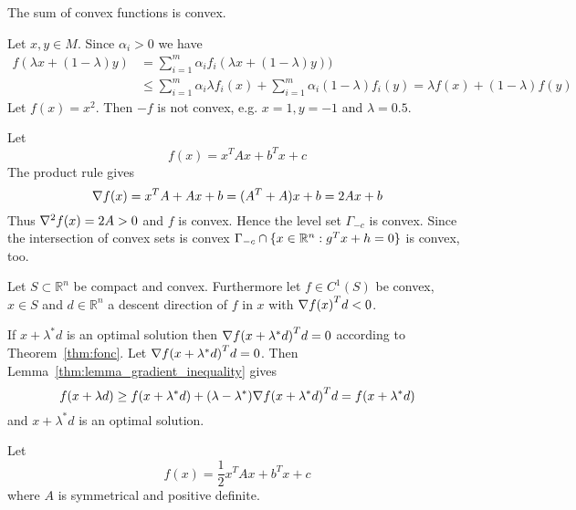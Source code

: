The sum of convex functions is convex.

\proof{}
Let \( x, y \in M \). Since \( \alpha_i  > 0 \) we have
\[
    \begin{split}
        f(\lambda x + (1 - \lambda) y) 
            & = \sum_{i=1}^m \alpha_i f_i(\lambda x + (1 - \lambda) y)) \\
            & \le \sum_{i=1}^m \alpha_i \lambda f_i(x) + \sum_{i=1}^m \alpha_i (1 - \lambda) f_i(y) 
                 =  \lambda f(x) + (1 - \lambda) f(y) 
    \end{split}
\]
Let \( f(x) = x^2 \). Then \( -f \) is not convex, e.g. \( x = 1, y = -1 \) and \( \lambda = 0.5 \).
\bigskip


Let 
\[
    f(x) = x^{T}Ax + b^{T}x + c 
\]
\proof{}
The product rule gives 
\[ 
    \nabla {f(x)} = x^{T}A + Ax + b = (A^{T} + A)x + b = 2Ax + b 
\] 
Thus \( \nabla^2 {f(x)} = 2A > 0 \) and \( f \) is convex. Hence the level set \( \Gamma_{-c} \) is convex.
Since the intersection of convex sets is convex \( \Gamma_{-c} \cap \{ x \in \mathbb{R}^n: g^{T}x + h = 0 \} \) is convex, too.
\bigskip


Let \( S \subset \mathbb{R}^n \) be compact and convex. Furthermore let \( f \in C^1(S) \) be convex,
\( x \in S \) and \( d \in \mathbb{R}^n \) a descent direction of \( f \) in \( x \) 
with \( \nabla {f(x)}^T d < 0 \).

\proof{}
If  \( x + \lambda^* d \) is an optimal solution then \( \nabla {f(x + \lambda^* d)}^T d = 0 \) 
according to Theorem~\ref{thm:fonc}.
Let \( \nabla {f(x + \lambda^* d)}^T d = 0 \). Then Lemma~\ref{thm:lemma_gradient_inequality} gives 
\[
    f(x + \lambda d) \ge f(x + \lambda^* d) + (\lambda - \lambda^*) \nabla {f(x + \lambda^* d)}^T d 
        = f(x + \lambda^* d) 
\]
and \( x + \lambda^* d \) is an optimal solution.
\bigskip


Let 
\[
       f(x) = \frac{1}{2} x^T{A}x + b^T x + c
\]
where \( A \) is symmetrical and positive definite. 


